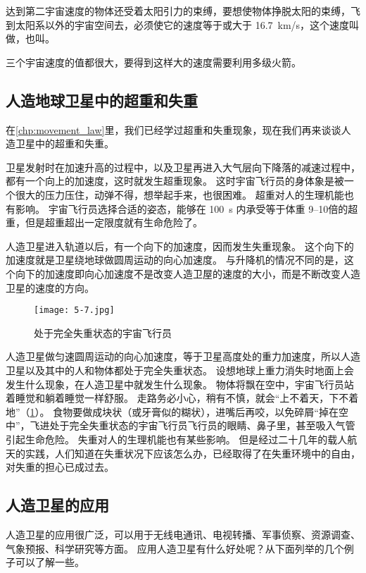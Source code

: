 达到第二宇宙速度的物体还受着太阳引力的束缚，要想使物体挣脱太阳的束缚，飞到太阳系以外的宇宙空间去，必须使它的速度等于或大于 \qty{16.7}{km/s}，这个速度叫做，也叫。

三个宇宙速度的值都很大，要得到这样大的速度需要利用多级火箭。

\subsection{人造地球卫星中的超重和失重}

在\cref{chp:movement_law}里，我们已经学过超重和失重现象，现在我们再来谈谈人造卫星中的超重和失重。

卫星发射时在加速升高的过程中，以及卫星再进入大气层向下降落的减速过程中，都有一个向上的加速度，这时就发生超重现象。
这时宇宙飞行员的身体象是被一个很大的压力压住，动弹不得，想举起手来，也很困难。
超重对人的生理机能也有影响。
宇宙飞行员选择合适的姿态，能够在 \qty{100}{s} 内承受等于体重 \numrange{9}{10}倍的超重，但是超重超出一定限度就有生命危险了。

人造卫星进入轨道以后，有一个向下的加速度，因而发生失重现象。
这个向下的加速度就是卫星绕地球做圆周运动的向心加速度。
与升降机的情况不同的是，这个向下的加速度即向心加速度不是改变人造卫屋的速度的大小，而是不断改变人造卫星的速度的方向。

\begin{figure}
	\texttt{[image: 5-7.jpg]}
	\caption{处于完全失重状态的宇宙飞行员}\label{fig:5-7}
\end{figure}

人造卫星做匀速圆周运动的向心加速度，等于卫星高度处的重力加速度，所以人造卫星以及其中的人和物体都处于完全失重状态。
设想地球上重力消失时地面上会发生什么现象，在人造卫星中就发生什么现象。
物体将飘在空中，宇宙飞行员站着睡觉和躺着睡觉一样舒服。
走路务必小心，稍有不慎，就会“上不着天，下不着地”（\cref{fig:5-7}）。
食物要做成块状（或牙膏似的糊状），进嘴后再咬，以免碎屑“掉在空中”，飞进处于完全失重状态的宇宙飞行员飞行员的眼睛、鼻子里，甚至吸入气管引起生命危险。
失重对人的生理机能也有某些影响。
但是经过二十几年的载人航天的实践，人们知道在失重状况下应该怎么办，已经取得了在失重环境中的自由，对失重的担心已成过去。

\subsection{人造卫星的应用}

人造卫星的应用很广泛，可以用于无线电通讯、电视转播、军事侦察、资源调查、气象预报、科学研究等方面。
应用人造卫星有什么好处呢？从下面列举的几个例子可以了解一些。


